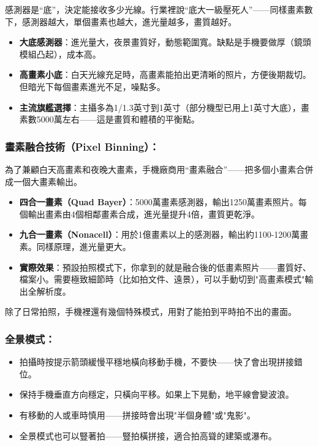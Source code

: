 感測器是“底”，決定能接收多少光線。行業裡說“底大一級壓死人”——同樣畫素數下，感測器越大，單個畫素也越大，進光量越多，畫質越好。

\begin{itemize}
  \item \textbf{大底感測器}：進光量大，夜景畫質好，動態範圍寬。缺點是手機要做厚（鏡頭模組凸起），成本高。
  \item \textbf{高畫素小底}：白天光線充足時，高畫素能拍出更清晰的照片，方便後期裁切。但暗光下每個畫素進光不足，噪點多。
  \item \textbf{主流旗艦選擇}：主攝多為1/1.3英寸到1英寸（部分機型已用上1英寸大底），畫素數5000萬左右——這是畫質和體積的平衡點。
\end{itemize}

\subsubsection*{畫素融合技術（Pixel Binning）：}

為了兼顧白天高畫素和夜晚大畫素，手機廠商用“畫素融合”——把多個小畫素合併成一個大畫素輸出。

\begin{itemize}
  \item \textbf{四合一畫素（Quad Bayer）}：5000萬畫素感測器，輸出1250萬畫素照片。每個輸出畫素由4個相鄰畫素合成，進光量提升4倍，畫質更乾淨。
  \item \textbf{九合一畫素（Nonacell）}：用於1億畫素以上的感測器，輸出約1100-1200萬畫素。同樣原理，進光量更大。
  \item \textbf{實際效果}：預設拍照模式下，你拿到的就是融合後的低畫素照片——畫質好、檔案小。需要極致細節時（比如拍文件、遠景），可以手動切到"高畫素模式"輸出全解析度。
\end{itemize}


除了日常拍照，手機裡還有幾個特殊模式，用對了能拍到平時拍不出的畫面。

\subsubsection*{全景模式：}

\begin{itemize}
  \item 拍攝時按提示箭頭緩慢平穩地橫向移動手機，不要快——快了會出現拼接錯位。
  \item 保持手機垂直方向穩定，只橫向平移。如果上下晃動，地平線會變波浪。
  \item 有移動的人或車時慎用——拼接時會出現"半個身體"或"鬼影"。
  \item 全景模式也可以豎著拍——豎拍橫拼接，適合拍高聳的建築或瀑布。
\end{itemize}

